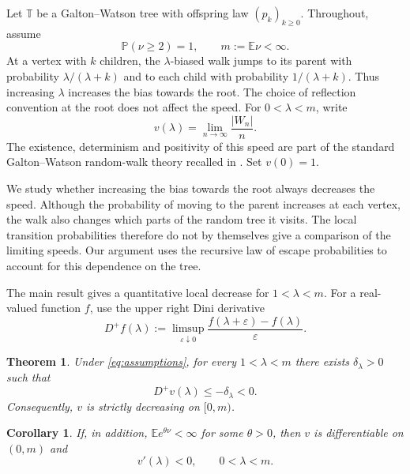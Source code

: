 \documentclass[11pt,a4paper]{article}
\numberwithin{equation}{section}
\theoremstyle{notethm}
\newtheorem{theorem}{Theorem}[section]
\newtheorem{corollary}[corollary]{Corollary}
\theoremstyle{definition}
\newcommand{\E}{\mathbb E}
\newcommand{\PP}{\mathbb P}
\newcommand{\Dplus}{D^{+}}
\begin{document}
Let $\mathbb T$ be a Galton--Watson tree with offspring law $(p_k)_{k\ge0}$.
Throughout, assume
\begin{equation}\label{eq:assumptions}
 \PP(\nu\ge2)=1,\qquad m:=\E\nu<\infty.
\end{equation}
At a vertex with $k$ children, the $\lambda$-biased walk jumps to its parent
with probability $\lambda/(\lambda+k)$ and to each child with probability
$1/(\lambda+k)$. Thus increasing $\lambda$ increases the bias towards the root.
The choice of reflection convention at the root does not affect the speed.
For $0<\lambda<m$, write
\begin{equation}\label{eq:speed-def}
 v(\lambda)=\lim_{n\to\infty}\frac{|W_n|}{n}.
\end{equation}
The existence, determinism and positivity of this speed are part of the
standard Galton--Watson random-walk theory recalled in
\cite[Section~1]{Aidekon}. Set $v(0)=1$.

We study whether increasing the bias towards the root always decreases
the speed. Although the probability of moving to the parent increases at
each vertex, the walk also changes which parts of the random tree it
visits. The local transition probabilities therefore do not by themselves
give a comparison of the limiting speeds. Our argument uses the recursive
law of escape probabilities to account for this dependence on the tree.

The main result gives a quantitative local decrease for $1<\lambda<m$.
For a real-valued function $f$, use the upper right Dini derivative
\begin{equation}\label{eq:dini-def}
 \Dplus f(\lambda)
 :=\limsup_{\varepsilon\downarrow0}
       \frac{f(\lambda+\varepsilon)-f(\lambda)}{\varepsilon}.
\end{equation}

\begin{theorem}\label{thm:main}
Under \eqref{eq:assumptions}, for every $1<\lambda<m$ there exists
$\delta_\lambda>0$ such that
\begin{equation}\label{eq:main-dini}
 \Dplus v(\lambda)\le-\delta_\lambda<0.
\end{equation}
Consequently, $v$ is strictly decreasing on $[0,m)$.
\end{theorem}

\begin{corollary}\label{cor:derivative}
If, in addition, $\E e^{\theta\nu}<\infty$ for some $\theta>0$, then
$v$ is differentiable on $(0,m)$ and
\begin{equation}\label{eq:negative-derivative}
 v'(\lambda)<0,\qquad 0<\lambda<m.
\end{equation}
\end{corollary}
\end{document}
